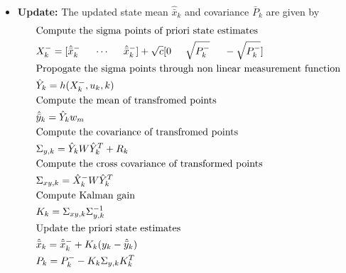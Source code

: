 \begin{itemize}
    \item \textbf{Update:} The updated state mean $\hat{\bar x}_k$ and covariance ${\bar P}_k$ are given by
    \begin{equation}
        \begin{split}
        &\text{Compute the sigma points of priori state estimates}\\
        &X_k^- = [ \hat{\bar{x}}_k^- \hspace{5mm} \cdots \hspace{5mm} \hat{\bar{x}}_k^-]+ \sqrt c [ 0 \hspace{5mm} \sqrt{P_k^-} \hspace{5mm} - \sqrt{P_k^-} ]\\
        &\text{Propogate the sigma points through non linear measurement function}\\
        &\hat Y_k = h(X_{k}^-,u_k,k) \\
        &\text{Compute the mean of transfromed points}\\
        &\hat{\bar y}_k = \hat Y_k w_m \\
        &\text{Compute the covariance of transfromed points}\\
        &\Sigma_{y,k} = \hat Y_k W \hat Y_k^T + R_k \\
        &\text{Compute the cross covariance of transformed points}\\
        &\Sigma_{xy,k} = \hat X_k^- W \hat Y_k^T \\
        &\text{Compute Kalman gain}\\
        &K_k = \Sigma_{xy,k} \Sigma_{y,k}^{-1}\\
        &\text{Update the priori state estimates}\\
        &\hat{\bar{x}}_k = \hat{\bar{x}}_k^- + K_k(y_k - \hat{\bar y}_k)\\
        &P_k = P_k^- - K_k \Sigma_{y,k} K_k^T
        \end{split}
    \end{equation}

\end{itemize}

